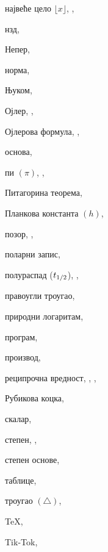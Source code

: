 \begin{theindex}
  \indexspace

  \item највеће цело $\lfloor x\rfloor$, , 
  \item нзд, 
  \item Непер, 
  \item норма, 

  \indexspace

  \item Њуком, 

  \indexspace

  \item Ојлер, , 
  \item Ојлерова формула, , 
  \item основа, 

  \indexspace

  \item пи $(\pi)$, , 
  \item Питагорина теорема, 
  \item Планкова константа $(h)$, 
  \item позор, , 
  \item поларни запис, 
  \item полураспад ($t_{1/2}$), , 
  \item правоугли троугао, 
  \item природни логаритам, 
  \item програм, 
  \item производ, 

  \indexspace

  \item реципрочна вредност, , 
		, 
  \item Рубикова коцка, 

  \indexspace

  \item скалар, 
  \item степен, , 
  \item степен основе, 

  \indexspace

  \item таблице, 
  \item троугао $(\triangle )$, 
  \interskip
  \item \TeX, 
  \item Tik-Tok, 


\end{theindex}
